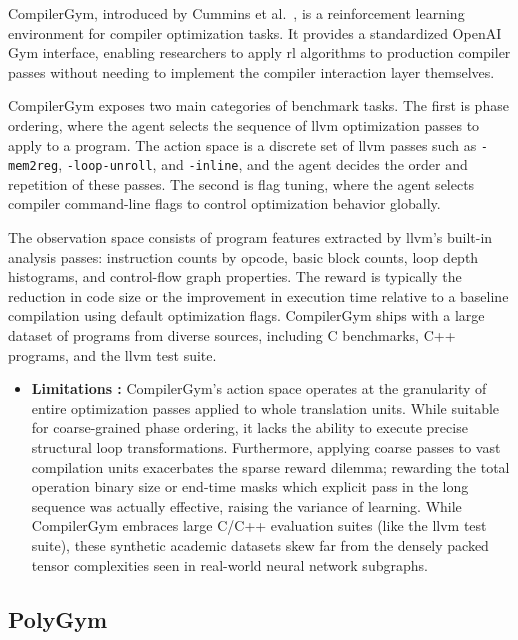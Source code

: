 CompilerGym, introduced by Cummins et al.~\cite{cummins2021compilergym}, is a reinforcement learning environment for compiler optimization tasks. It provides a standardized OpenAI Gym interface, enabling researchers to apply \gls{rl} algorithms to production compiler passes without needing to implement the compiler interaction layer themselves.

CompilerGym exposes two main categories of benchmark tasks. The first is phase ordering, where the agent selects the sequence of \gls{llvm} optimization passes to apply to a program. The action space is a discrete set of \gls{llvm} passes such as \texttt{-mem2reg}, \texttt{-loop-unroll}, and \texttt{-inline}, and the agent decides the order and repetition of these passes. The second is flag tuning, where the agent selects compiler command-line flags to control optimization behavior globally.

The observation space consists of program features extracted by \gls{llvm}'s built-in analysis passes: instruction counts by opcode, basic block counts, loop depth histograms, and control-flow graph properties. The reward is typically the reduction in code size or the improvement in execution time relative to a baseline compilation using default optimization flags. CompilerGym ships with a large dataset of programs from diverse sources, including C benchmarks, C++ programs, and the \gls{llvm} test suite.

\begin{itemize}
\item \textbf{Limitations :} CompilerGym's action space operates at the granularity of entire optimization passes applied to whole translation units. While suitable for coarse-grained phase ordering, it lacks the ability to execute precise structural loop transformations. Furthermore, applying coarse passes to vast compilation units exacerbates the sparse reward dilemma; rewarding the total operation binary size or end-time masks which explicit pass in the long sequence was actually effective, raising the variance of learning. While CompilerGym embraces large C/C++ evaluation suites (like the \gls{llvm} test suite), these synthetic academic datasets skew far from the densely packed tensor complexities seen in real-world neural network subgraphs.
\end{itemize}

\subsection{PolyGym}

